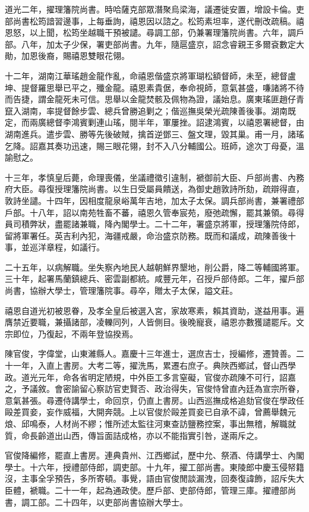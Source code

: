 \begin{pinyinscope}
道光二年，擢理籓院尚書。時哈薩克部眾潛聚烏梁海，議遷徙安置，增設卡倫。吏部尚書松筠諳習邊事，上每垂詢，禧恩因以諮之。松筠素坦率，遂代刪改疏稿。禧恩怒，以上聞，松筠坐越職干預被譴。尋調工部，仍兼署理籓院尚書。六年，調戶部。八年，加太子少保，署吏部尚書。九年，隨扈盛京，詔念睿親王多爾袞數定大勛，加恩後裔，賜禧恩雙眼花翎。

十二年，湖南江華瑤趙金龍作亂，命禧恩偕盛京將軍瑚松額督師，未至，總督盧坤、提督羅思舉已平之，殲金龍。禧恩素貴倨，奉命視師，意氣甚盛，嗛諸將不待而告捷，謂金龍死未可信。思舉以金龍焚骸及佩物為證，議始息。廣東瑤匪趙仔青竄入湖南，率提督餘步雲、總兵曾勝追剿之；偕巡撫吳榮光疏陳善後事。湖南既定，而兩廣總督李鴻賓剿連山瑤，閱半年，軍屢挫。詔逮鴻賓，以禧恩署總督，由湖南進兵。遣步雲、勝等先後破賊，擒首逆鄧三、盤文理，毀其巢。甫一月，諸瑤乞降。詔嘉其奏功迅速，賜三眼花翎，封不入八分輔國公。班師，途次丁母憂，溫諭慰之。

十三年，孝慎皇后薨，命理喪儀，坐議禮徵引違制，褫御前大臣、戶部尚書、內務府大臣。尋復授理籓院尚書。以生日受屬員饋送，為御史趙敦詩所劾，疏辯得直，敦詩坐譴。十四年，因相度龍泉峪萬年吉地，加太子太保。調兵部尚書，兼署禮部戶部。十八年，詔以南苑牲畜不蕃，禧恩久管奉宸苑，廢弛疏懈，罷其兼領。尋得員司積弊狀，盡罷諸兼職，降內閣學士。二十二年，署盛京將軍，授理籓院侍郎，留將軍署任。英吉利內犯，海疆戒嚴，命治盛京防務。既而和議成，疏陳善後十事，並巡洋章程，如議行。

二十五年，以病解職。坐失察內地民人越朝鮮界墾地，削公爵，降二等輔國將軍。三十年，起署馬蘭鎮總兵、密雲副都統。咸豐元年，召授戶部侍郎。二年，擢戶部尚書，協辦大學士，管理籓院事。尋卒，贈太子太保，謚文莊。

禧恩自道光初被恩眷，及孝全皇后被選入宮，家故寒素，賴其資助，遂益用事。遍膺禁近要職，兼攝諸部，凌轢同列，人皆側目。後晚寵衰，禧恩亦數獲譴罷斥。文宗即位，乃復起，不兩年登協揆焉。

陳官俊，字偉堂，山東濰縣人。嘉慶十三年進士，選庶吉士，授編修，遷贊善。二十一年，入直上書房。大考二等，擢洗馬，累遷右庶子。典陜西鄉試，督山西學政。道光元年，命各省明定陋規，中外臣工多言窒礙，官俊亦疏陳不可行，詔嘉之，予議敘。會密諭留心察訪官吏賢否、政治得失，官俊恃曾直內廷為宣宗所眷，意氣甚張。尋遷侍講學士，命回京，仍直上書房。山西巡撫成格追劾官俊在學政任毆差買妾，妄作威福，大開奔競。上以官俊於毆差買妾已自承不諱，曾薦舉魏元烺、邱鳴泰，人材尚不繆；惟所述太監往河東查訪鹽務控案，事出無稽，解職就質，命長齡道出山西，傳旨面詰成格，亦以不能指實引咎，遂兩斥之。

官俊降編修，罷直上書房。連典貴州、江西鄉試，歷中允、祭酒、侍講學士、內閣學士。十六年，授禮部侍郎，調吏部。十九年，擢工部尚書。東陵郎中慶玉侵帑籍沒，主事全孚預告，多所寄頓。事覺，語由官俊閒談漏洩，回奏復諱飾，詔斥失大臣體，褫職。二十一年，起為通政使。歷戶部、吏部侍郎，管理三庫。擢禮部尚書，調工部。二十四年，以吏部尚書協辦大學士。


\end{pinyinscope}
